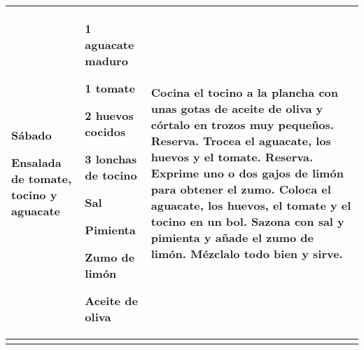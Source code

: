 \documentclass[menu.tex]{subfiles}
\begin{document}
\begin{tabular} {p{3cm} p{4.5cm} p{9cm}}
\pbox{20cm}
{
    \rule{0pt}{3ex}\begin{large}\textbf{Sábado}\end{large}\\ 
    \rule{0pt}{2ex}Ensalada de \\tomate, tocino \\y aguacate
} & 
\vspace{-0.6cm}
\begin{compactitem} 
    \begin{footnotesize}
        \item 1 aguacate maduro
        \item 1 tomate
        \item 2 huevos cocidos
        \item 3 lonchas de tocino
        \item Sal
        \item Pimienta
        \item Zumo de limón
        \item Aceite de oliva
    \end{footnotesize}
\end{compactitem}&
\vspace{-0.6cm}
Cocina el tocino a la plancha con unas gotas de aceite de oliva y córtalo en trozos muy pequeños. Reserva.
Trocea el aguacate, los huevos y el tomate. Reserva.
Exprime uno o dos gajos de limón para obtener el zumo.
Coloca el aguacate, los huevos, el tomate y el tocino en un bol.
Sazona con sal y pimienta y añade el zumo de limón.
Mézclalo todo bien y sirve.\\
\hline

\newpage        
\end{tabular}
\end{document}
